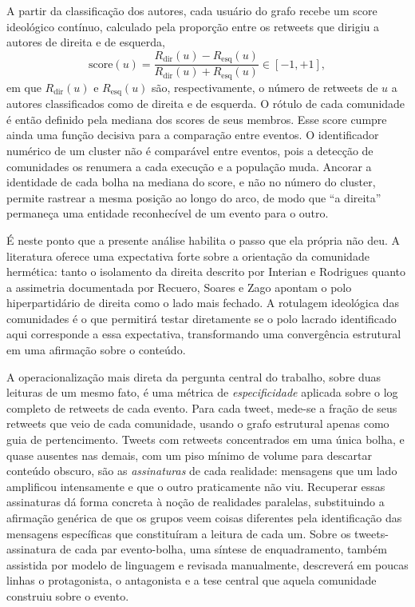 \documentclass[conference]{IEEEtran}
\begin{document}
A partir da classificação dos autores, cada usuário do grafo recebe um score ideológico contínuo, calculado pela proporção entre os retweets que dirigiu a autores de direita e de esquerda,
\begin{equation}
\mathrm{score}(u) = \frac{R_{\text{dir}}(u) - R_{\text{esq}}(u)}{R_{\text{dir}}(u) + R_{\text{esq}}(u)} \in [-1, +1],
\label{eq:score}
\end{equation}
em que $R_{\text{dir}}(u)$ e $R_{\text{esq}}(u)$ são, respectivamente, o número de retweets de $u$ a autores classificados como de direita e de esquerda. O rótulo de cada comunidade é então definido pela mediana dos scores de seus membros. Esse score cumpre ainda uma função decisiva para a comparação entre eventos. O identificador numérico de um cluster não é comparável entre eventos, pois a detecção de comunidades os renumera a cada execução e a população muda. Ancorar a identidade de cada bolha na mediana do score, e não no número do cluster, permite rastrear a mesma posição ao longo do arco, de modo que ``a direita'' permaneça uma entidade reconhecível de um evento para o outro.

É neste ponto que a presente análise habilita o passo que ela própria não deu. A literatura oferece uma expectativa forte sobre a orientação da comunidade hermética: tanto o isolamento da direita descrito por Interian e Rodrigues \cite{b_interian2023} quanto a assimetria documentada por Recuero, Soares e Zago \cite{b_recuero2021} apontam o polo hiperpartidário de direita como o lado mais fechado. A rotulagem ideológica das comunidades é o que permitirá testar diretamente se o polo lacrado identificado aqui corresponde a essa expectativa, transformando uma convergência estrutural em uma afirmação sobre o conteúdo.

A operacionalização mais direta da pergunta central do trabalho, sobre duas leituras de um mesmo fato, é uma métrica de \emph{especificidade} aplicada sobre o log completo de retweets de cada evento. Para cada tweet, mede-se a fração de seus retweets que veio de cada comunidade, usando o grafo estrutural apenas como guia de pertencimento. Tweets com retweets concentrados em uma única bolha, e quase ausentes nas demais, com um piso mínimo de volume para descartar conteúdo obscuro, são as \emph{assinaturas} de cada realidade: mensagens que um lado amplificou intensamente e que o outro praticamente não viu. Recuperar essas assinaturas dá forma concreta à noção de realidades paralelas, substituindo a afirmação genérica de que os grupos veem coisas diferentes pela identificação das mensagens específicas que constituíram a leitura de cada um. Sobre os tweets-assinatura de cada par evento-bolha, uma síntese de enquadramento, também assistida por modelo de linguagem e revisada manualmente, descreverá em poucas linhas o protagonista, o antagonista e a tese central que aquela comunidade construiu sobre o evento.
\end{document}

